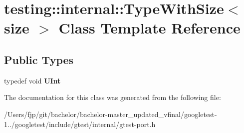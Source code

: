 \hypertarget{classtesting_1_1internal_1_1_type_with_size}{}\section{testing\+:\+:internal\+:\+:Type\+With\+Size$<$ size $>$ Class Template Reference}
\label{classtesting_1_1internal_1_1_type_with_size}
\subsection*{Public Types}
\begin{DoxyCompactItemize}
\item 
\mbox{\label{classtesting_1_1internal_1_1_type_with_size_a3898640d9f6c1e18110eef90f47a5d7b}} 
typedef void {\bfseries U\+Int}
\end{DoxyCompactItemize}


The documentation for this class was generated from the following file\+:\begin{DoxyCompactItemize}
\item 
/\+Users/fjp/git/bachelor/bachelor-\/master\+\_\+updated\+\_\+vfinal/googletest-\/1../googletest/include/gtest/internal/gtest-\/port.\+h\end{DoxyCompactItemize}
